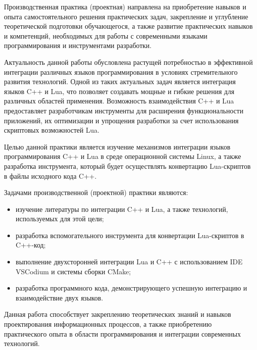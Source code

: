 
Производственная практика (проектная) направлена на приобретение навыков и опыта самостоятельного решения практических задач, закрепление и углубление теоретической подготовки обучающегося, а также развитие практических навыков и компетенций, необходимых для работы с современными языками программирования и инструментами разработки.

Актуальность данной работы обусловлена растущей потребностью в эффективной интеграции различных языков программирования в условиях стремительного развития технологий. Одной из таких актуальных задач является интеграция языков C++ и Lua, что позволяет создавать мощные и гибкие решения для различных областей применения. Возможность взаимодействия C++ и Lua предоставляет разработчикам инструменты для расширения функциональности приложений, их оптимизации и упрощения разработки за счет использования скриптовых возможностей Lua.

Целью данной практики является изучение механизмов интеграции языков программирования C++ и Lua в среде операционной системы Linux, а также разработка инструмента, который будет осуществлять конвертацию Lua-скриптов в файлы исходного кода C++.

Задачами производственной (проектной) практики являются:
\begin{itemize}
	\item изучение литературы по интеграции C++ и Lua, а также технологий, используемых для этой цели;
	\item разработка вспомогательного инструмента для конвертации Lua-скриптов в C++-код;
	\item выполнение двухсторонней интеграции Lua и C++ с использованием IDE VSCodium и системы сборки CMake;
	\item разработка программного кода, демонстрирующего успешную интеграцию и взаимодействие двух языков.
\end{itemize}

Данная работа способствует закреплению теоретических знаний и навыков проектирования информационных процессов, а также приобретению практического опыта в области программирования и интеграции современных технологий.

\clearpage

